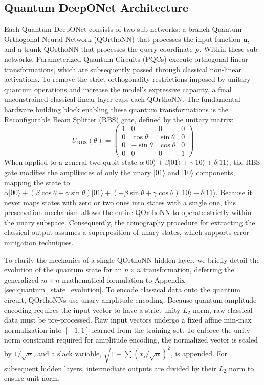 \documentclass{iopjournal}
\begin{document}
\subsection{Quantum DeepONet Architecture}

Each Quantum DeepONet consists of two sub-networks: a branch Quantum Orthogonal Neural Network (QOrthoNN) that processes the input function $\mathbf{u}$, and a trunk QOrthoNN that processes the query coordinate $\mathbf{y}$. Within these sub-networks, Parameterized Quantum Circuits (PQCs) execute orthogonal linear transformations, which are subsequently passed through classical non-linear activations. To remove the strict orthogonality restrictions imposed by unitary quantum operations and increase the model's expressive capacity, a final unconstrained classical linear layer caps each QOrthoNN. The fundamental hardware building block enabling these quantum transformations is the Reconfigurable Beam Splitter (RBS) gate, defined by the unitary matrix:
\[
    U_\mathrm{RBS}(\theta) = 
    \begin{pmatrix}
    1 & 0 & 0 & 0 \\
    0 & \cos\theta & \sin\theta & 0 \\
    0 & -\sin\theta & \cos\theta & 0 \\
    0 & 0 & 0 & 1
    \end{pmatrix}
\]
When applied to a general two-qubit state $\alpha |00\rangle + \beta|01\rangle + \gamma|10\rangle + \delta |11\rangle$, the RBS gate modifies the amplitudes of only the unary $|01\rangle$ and $|10\rangle$ components, mapping the state to $\alpha |00\rangle + (\beta\cos\theta + \gamma\sin\theta)|01\rangle + (-\beta\sin\theta + \gamma\cos\theta)|10\rangle + \delta |11\rangle$. Because it never maps states with zero or two ones into states with a single one, this preservation mechanism allows the entire QOrthoNN to operate strictly within the unary subspace. Consequently, the tomography procedure for extracting the classical output assumes a superposition of unary states, which supports error mitigation techniques.

To clarify the mechanics of a single QOrthoNN hidden layer, we briefly detail the evolution of the quantum state for an $n \times n$ transformation, deferring the generalized $m \times n$ mathematical formulation to Appendix \ref{sec:quantum_state_evolution}. To encode classical data onto the quantum circuit, QOrthoNNs use unary amplitude encoding. Because quantum amplitude encoding requires the input vector to have a strict unity $L_2$-norm, raw classical data must be pre-processed. Raw input vectors undergo a fixed affine min-max normalization into $[-1, 1]$ learned from the training set. To enforce the unity norm constraint required for amplitude encoding, the normalized vector is scaled by $1/\sqrt{n}$, and a slack variable, $\sqrt{1 - \sum (x_i/\sqrt{n})^2}$, is appended. For subsequent hidden layers, intermediate outputs are divided by their $L_2$ norm to ensure unit norm.
\end{document}
